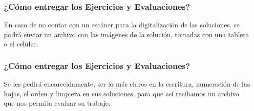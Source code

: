 \documentclass[12pt]{beamer}
\begin{document}
\begin{frame}
\frametitle{¿Cómo entregar los Ejercicios y Evaluaciones?}
En caso de no contar con un escáner para la digitalización de las soluciones, se podrá enviar un archivo con las imágenes de la solución, tomadas con una tableta o el celular.
\end{frame}
\begin{frame}
\frametitle{¿Cómo entregar los Ejercicios y Evaluaciones?}
Se les pedirá encarecidamente, ser lo más claros en la escritura, numeración de las hojas, el orden y limpieza en sus soluciones, para que así recibamos un archivo que nos permita evaluar su trabajo.
\end{frame}

 


% 

\end{document}
